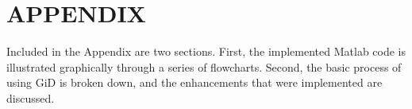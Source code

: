 \section{APPENDIX}

Included in the Appendix are two sections. First, the implemented Matlab code is illustrated graphically through a series of flowcharts. Second, the basic process of using GiD is broken down, and the enhancements that were implemented are discussed.
